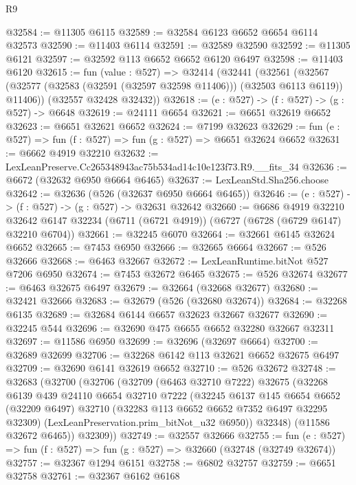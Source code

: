 \begin{lexlean}{R9}
\begin{coremodule}
@32584 := @11305 @6115
@32589 := @32584 @6123 @6652 @6654 @6114 @32573
@32590 := @11403 @6114
@32591 := @32589 @32590
@32592 := @11305 @6121
@32597 := @32592 @113 @6652 @6652 @6120 @6497
@32598 := @11403 @6120
@32615 := fun (value : @527) =>
  @32414
    (@32441
      (@32561
        (@32567 (@32577 (@32583 (@32591 (@32597 @32598 @11406))) (@32503 @6113 @6119)) @11406))
      (@32557 @32428 @32432))
@32618 := (e : @527) -> (f : @527) -> (g : @527) -> @6648
@32619 := @24111 @6654
@32621 := @6651 @32619 @6652
@32623 := @6651 @32621 @6652
@32624 := @7199 @32623
@32629 := fun (e : @527) => fun (f : @527) => fun (g : @527) => @6651 @32624 @6652
@32631 := @6662 @4919 @32210
@32632 := LexLeanPreserve.Cc265348943ac75b534ad14c10e123f73.R9.__fits_34
@32636 := @6672 (@32632 @6950 @6664 @6465)
@32637 := LexLeanStd.Sha256.choose
@32642 := @32636 (@526 (@32637 @6950 @6664 @6465))
@32646 := (e : @527) -> (f : @527) -> (g : @527) -> @32631 @32642
@32660 := @6686
    @4919
    @32210
    @32642
    @6147
    @32234
    (@6711 (@6721 @4919))
    (@6727 (@6728 (@6729 @6147) @32210 @6704))
@32661 := @32245 @6070
@32664 := @32661 @6145 @32624 @6652
@32665 := @7453 @6950
@32666 := @32665 @6664
@32667 := @526 @32666
@32668 := @6463 @32667
@32672 := LexLeanRuntime.bitNot @527 @7206 @6950
@32674 := @7453 @32672 @6465
@32675 := @526 @32674
@32677 := @6463 @32675 @6497
@32679 := @32664 (@32668 @32677)
@32680 := @32421 @32666
@32683 := @32679 (@526 (@32680 @32674))
@32684 := @32268 @6135
@32689 := @32684 @6144 @6657 @32623 @32667 @32677
@32690 := @32245 @544
@32696 := @32690 @475 @6655 @6652 @32280 @32667 @32311
@32697 := @11586 @6950
@32699 := @32696 (@32697 @6664)
@32700 := @32689 @32699
@32706 := @32268 @6142 @113 @32621 @6652 @32675 @6497
@32709 := @32690 @6141 @32619 @6652
@32710 := @526 @32672
@32748 := @32683
    (@32700
      (@32706
        (@32709
          (@6463 @32710 @7222)
          @32675
          (@32268
            @6139
            @439
            @24110
            @6654
            @32710
            @7222
            (@32245
              @6137
              @145
              @6654
              @6652
              (@32209 @6497)
              @32710
              (@32283 @113 @6652 @6652 @7352 @6497 @32295 @32309)
              (LexLeanPreservation.prim_bitNot_u32 @6950))
            @32348)
          (@11586 @32672 @6465))
        @32309))
@32749 := @32557 @32666
@32755 := fun (e : @527) => fun (f : @527) => fun (g : @527) => @32660 (@32748 (@32749 @32674))
@32757 := @32367 @1294 @6151
@32758 := @6802 @32757
@32759 := @6651 @32758
@32761 := @32367 @6162 @6168

\end{coremodule}
\end{lexlean}
